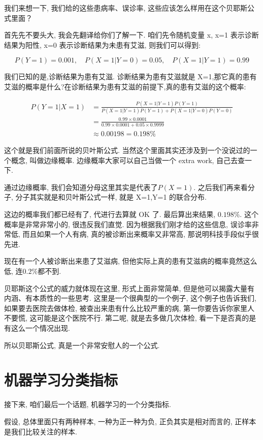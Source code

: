 我们来想一下, 我们给的这些患病率、误诊率, 这些应该怎么样用在这个贝耶斯公式里面？

首先先不要头大, 我会先翻译给你们了解一下. 咱们先令随机变量 x, x=1 表示诊断结果为阳性, x=0 表示诊断结果为未患有艾滋, 则我们可以得到: 

\[ P(Y=1) = 0.001, \quad P(X=1|Y=0) = 0.05, \quad P(X=1|Y=1) = 0.99\]

我们已知的是,诊断结果为患有艾滋. 诊断结果为患有艾滋就是 X=1,那它真的患有艾滋的概率是什么?在诊断结果为患有艾滋的前提下,真的患有艾滋的这个概率:

\begin{align*}
  P(Y=1|X=1) & = \frac{P(X=1|Y=1)P(Y=1)}{P(X=1|Y=1)P(Y=1)+P(X=1|Y=0)P(Y=0)} \\
  & = \frac{0.99 \times 0.0001}{0.99 \times 0.0001 + 0.05 \times 0.9999} \\
  & \approx 0.00198 = 0.198\%
\end{align*}

这个就是我们前面所说的贝叶斯公式. 当然这个里面其实还涉及到一个没说过的一个概念, 叫做边缘概率. 边缘概率大家可以自己当做一个 extra work, 自己去查一下. 

通过边缘概率, 我们会知道分母这里其实是代表了$P(X=1)$. 之后我们再来看分子, 分子其实就是和贝叶斯公式一样, 就是 X=1,Y=1 的联合分布. 

这边的概率我们都已经有了, 代进行去算就 OK 了. 最后算出来结果, $0.198\%$. 这个概率是非常非常小的, 很违反我们直觉. 因为根据我们刚才给的这些信息, 误诊率非常低, 而且如果一个人有病, 真的被诊断出来概率又非常高, 那说明科技手段似乎很先进. 

现在有一个人被诊断出来患了艾滋病, 但他实际上真的患有艾滋病的概率竟然这么低, 连$0.2\%$都不到. 

贝耶斯这个公式的威力就体现在这里, 形式上面非常简单, 但是他可以揭露大量有内涵、有本质性的一些思考. 这里是一个很典型的一个例子, 这个例子也告诉我们, 如果要去医院去做体检, 被查出来患有什么比较严重的病, 第一你要告诉你家里人不要慌, 这可能是这个医院不行. 第二呢, 就是去多做几次体检, 看一下是否真的是有这么一个情况出现. 

所以贝耶斯公式, 真是一个非常安慰人的一个公式. 

\section{机器学习分类指标}

接下来, 咱们最后一个话题, 机器学习的一个分类指标. 

假设, 总体里面只有两种样本, 一种为正一种为负, 正负其实是相对而言的, 正样本是我们比较关注的样本. 

